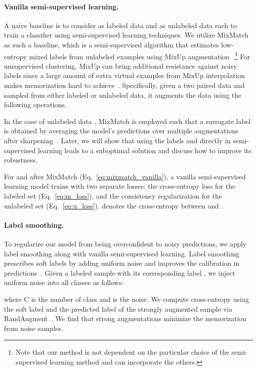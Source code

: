 \documentclass[final]{cvpr}
\newcommand{\cutparagraphup}{\vspace*{-0.15in}}
\begin{document}
\paragraph{Vanilla semi-supervised learning.} 
A naive baseline is to consider  as labeled data and  as unlabeled data each to train a classifier  using semi-supervised learning techniques.
We utilize MixMatch~\cite{berthelot2019mixmatch} as such a baseline, which is a semi-supervised algorithm that estimates low-entropy mixed labels from unlabeled examples using MixUp augmentation~\cite{zhang2017mixup}.\footnote{Note that our method is not dependent on the particular choice of the semi-supervised learning method and can incorporate the others.}
For unsupervised clustering, MixUp can bring additional resistance against noisy labels since a large amount of extra virtual examples from MixUp interpolation makes memorization hard to achieve~\cite{li2020dividemix, zhang2017mixup}. 
Specifically, given a two paired data  and  sampled from either labeled or unlabeled data, it augments the data using the following operations. \smallskip

In the case of unlabeled data , MixMatch is employed such that a surrogate label  is obtained by averaging the model's predictions over multiple augmentations after sharpening~\cite{berthelot2019mixmatch}.
Later, we will show that using the labels  and  directly in semi-supervised learning leads to a suboptimal solution and discuss how to improve its robustness.

For  and  after MixMatch (Eq.~\eqref{eq:mixmatch_vanilla}), a vanilla semi-supervised learning model trains with two separate losses: the cross-entropy loss for the labeled set  (Eq.~\eqref{eq:m_loss}), and the consistency regularization for the unlabeled set  (Eq.~\eqref{eq:u_loss}).  denotes the cross-entropy between  and .



\cutparagraphup
\paragraph{Label smoothing.} To regularize our model from being overconfident to noisy predictions, we apply label smoothing along with vanilla semi-supervised learning.
Label smoothing prescribes soft labels by adding uniform noise and improves the calibration in predictions~\cite{lukasik2020does}.
Given a labeled sample with its corresponding label , we inject uniform noise into all classes as follows: 
 
where C is the number of class and  is the noise. 
We compute cross-entropy using the soft label  and the predicted label of the strongly augmented sample  via RandAugment~\cite{cubuk2020randaugment}. We find that strong augmentations minimize the memorization from noise samples.  
\end{document}
